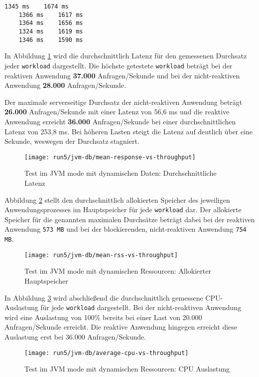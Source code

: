 \begin{lstlisting}[caption=Startzeiten im JVM mode mit dynamischen Ressourcen, captionpos=b, label=lst:starttimes_jvm_dynamic]
    1345 ms    1674 ms
    1366 ms    1617 ms
    1364 ms    1656 ms 
    1324 ms    1619 ms 
    1346 ms    1590 ms 
\end{lstlisting}
In Abbildung \ref{fig:jvm_dynamic_mean_response} wird die durchschnittlich Latenz für den gemessenen Durchsatz jeder \verb|workload| dargestellt.
Die höchste getestete \verb|workload| beträgt bei der reaktiven Anwendung \textbf{37.000} Anfragen/Sekunde und bei der
nicht-reaktiven Anwendung \textbf{28.000} Anfragen/Sekunde.

Der maximale serverseitige Durchsatz der nicht-reaktiven Anwendung beträgt \textbf{26.000} Anfragen/Sekunde mit einer
Latenz von 56,6 ms und
die reaktive Anwendung erreicht \textbf{36.000} Anfragen/Sekunde bei einer durchschnittlichen Latenz von 253,8 ms.
Bei höheren Lasten steigt die Latenz auf deutlich über eine Sekunde, weswegen der Durchsatz stagniert.
\newpage
\begin{figure}[ht!]
  \centering
  \texttt{[image: run5/jvm-db/mean-response-vs-throughput]}
  \caption{Test im JVM mode mit dynamischen Daten: Durchschnittliche Latenz}
  \label{fig:jvm_dynamic_mean_response}
\end{figure}
Abbildung \ref{fig:jvm_dynamic_mean_rss} stellt den durchschnittlich allokierten Speicher des jeweiligen Anwendungsprozesses
im Hauptspeicher für jede \verb|workload| dar. Der allokierte Speicher für die genannten maximalen Durchsätze beträgt dabei bei
der reaktiven Anwendung \verb|573 MB| und bei der blockierenden, nicht-reaktiven Anwendung \verb|754 MB|.
\newpage
\begin{figure}[ht!]
  \centering
  \texttt{[image: run5/jvm-db/mean-rss-vs-throughput]}
  \caption{Test im JVM mode mit dynamischen Ressourcen: Allokierter Hauptspeicher}
  \label{fig:jvm_dynamic_mean_rss}
\end{figure}

In Abbildung \ref{fig:jvm_dynamic_avg_cpu} wird abschließend die durchschnittlich gemessene CPU-Auslastung für jede \verb|workload|
dargestellt. Bei der nicht-reaktiven Anwendung wird eine Auslastung von 100\% bereits bei einer Last von
20.000 Anfragen/Sekunde erreicht. Die reaktive Anwendung hingegen erreicht diese Auslastung erst bei 36.000 Anfragen/Sekunde.
\newpage
\begin{figure}[ht!]
  \centering
  \texttt{[image: run5/jvm-db/average-cpu-vs-throughput]}
  \caption{Test im JVM mode mit dynamischen Ressourcen: CPU Auslastung}
  \label{fig:jvm_dynamic_avg_cpu}
\end{figure}

